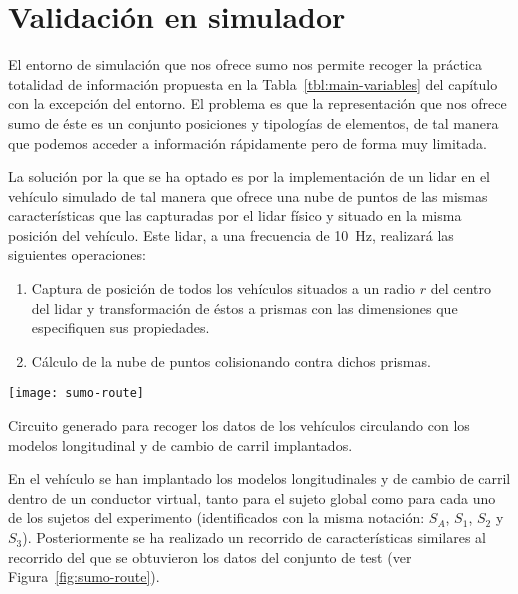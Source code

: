 \chapter{Validación en simulador}
\label{ch:simulation-implementation}

El entorno de simulación que nos ofrece \gls{sumo} nos permite recoger la práctica totalidad de información propuesta en la Tabla~\ref{tbl:main-variables} del capítulo  con la excepción del entorno. El problema es que la representación que nos ofrece \gls{sumo} de éste es un conjunto posiciones y tipologías de elementos, de tal manera que podemos acceder a información rápidamente pero de forma muy limitada.

La solución por la que se ha optado es por la implementación de un \acrshort{lidar} en el vehículo simulado de tal manera que ofrece una nube de puntos de las mismas características que las capturadas por el \acrshort{lidar} físico y situado en la misma posición del vehículo. Este \acrshort{lidar}, a una frecuencia de \SI{10}{\hertz}, realizará las siguientes operaciones:

\begin{enumerate}
	\item Captura de posición de todos los vehículos situados a un radio $r$ del centro del \acrshort{lidar} y transformación de éstos a prismas con las dimensiones que especifiquen sus propiedades.
	\item Cálculo de la nube de puntos colisionando contra dichos prismas.
\end{enumerate}

\begin{marginfigure}
	\centering
	\texttt{[image: sumo-route]}
	\caption[Circuito de prueba en el entorno virtual]{Circuito generado para recoger los datos de los vehículos circulando con los modelos longitudinal y de cambio de carril implantados.}
	\label{fig:sumo-route}
\end{marginfigure}

En el vehículo se han implantado los modelos longitudinales y de cambio de carril dentro de un conductor virtual, tanto para el sujeto global como para cada uno de los sujetos del experimento (identificados con la misma notación: $S_A$, $S_1$, $S_2$ y $S_3$). Posteriormente se ha realizado un recorrido de características similares al recorrido del que se obtuvieron los datos del conjunto de test (ver Figura~\ref{fig:sumo-route}).

